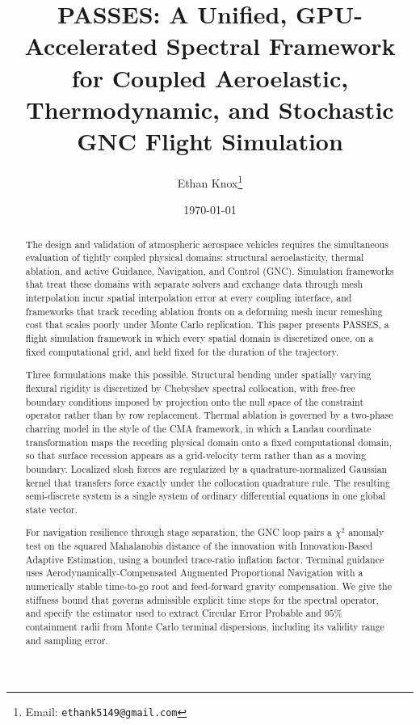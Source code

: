 \documentclass[11pt,a4paper]{article}
\title{PASSES: A Unified, GPU-Accelerated Spectral Framework for Coupled Aeroelastic, Thermodynamic, and Stochastic GNC Flight Simulation}
\author[1]{Ethan Knox\thanks{Email: \texttt{ethank5149@gmail.com}}}
\affil[1]{Independent Researcher, Champaign, IL, USA}
\date{\today}
\theoremstyle{definition}
\numberwithin{equation}{section}
\begin{document}
\maketitle

\begin{abstract}
    The design and validation of atmospheric aerospace vehicles requires the simultaneous evaluation of tightly coupled physical domains: structural aeroelasticity, thermal ablation, and active Guidance, Navigation, and Control (GNC). Simulation frameworks that treat these domains with separate solvers and exchange data through mesh interpolation incur spatial interpolation error at every coupling interface, and frameworks that track receding ablation fronts on a deforming mesh incur remeshing cost that scales poorly under Monte Carlo replication. This paper presents PASSES, a flight simulation framework in which every spatial domain is discretized once, on a fixed computational grid, and held fixed for the duration of the trajectory.

    Three formulations make this possible. Structural bending under spatially varying flexural rigidity is discretized by Chebyshev spectral collocation, with free-free boundary conditions imposed by projection onto the null space of the constraint operator rather than by row replacement. Thermal ablation is governed by a two-phase charring model in the style of the CMA framework, in which a Landau coordinate transformation maps the receding physical domain onto a fixed computational domain, so that surface recession appears as a grid-velocity term rather than as a moving boundary. Localized slosh forces are regularized by a quadrature-normalized Gaussian kernel that transfers force exactly under the collocation quadrature rule. The resulting semi-discrete system is a single system of ordinary differential equations in one global state vector.

    For navigation resilience through stage separation, the GNC loop pairs a $\chi^2$ anomaly test on the squared Mahalanobis distance of the innovation with Innovation-Based Adaptive Estimation, using a bounded trace-ratio inflation factor. Terminal guidance uses Aerodynamically-Compensated Augmented Proportional Navigation with a numerically stable time-to-go root and feed-forward gravity compensation. We give the stiffness bound that governs admissible explicit time steps for the spectral operator, and specify the estimator used to extract Circular Error Probable and $95\%$ containment radii from Monte Carlo terminal dispersions, including its validity range and sampling error.


\end{abstract}
\end{document}

